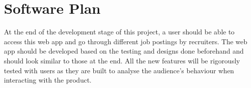\section{Software Plan}
At the end of the development stage of this project, a user should be able to access this web app and go through different job postings by recruiters. The web app should be developed based on the testing and designs done beforehand and should look similar to those at the end. All the new features will be rigorously tested with users as they are built to analyse the audience's behaviour when interacting with the product.
